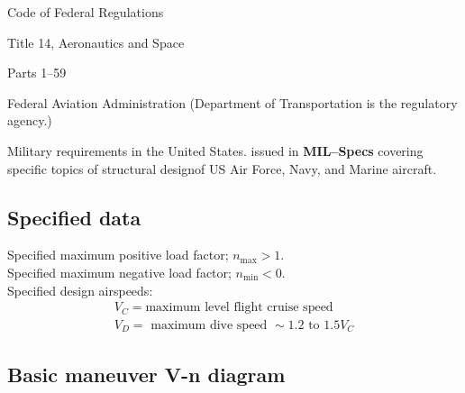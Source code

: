 \documentclass{AeroStructure-ERJohnson}
\begin{document}
\begin{unlist}
  \item[] Code of Federal Regulations
  \item[] \qquad Title 14, Aeronautics and Space
  \item[] \qquad Parts 1--59
  \item[] Federal Aviation Administration (Department of Transportation is the regulatory agency.)
  \item[] Military requirements in the United States. issued in \textbf{MIL--Specs} covering specific topics of structural design\break \hspace*{-15pt}of US Air Force, Navy, and Marine aircraft.
\end{unlist}

\subsection{Specified data}\label{sec2.4.3}

Specified maximum positive load factor; $n_{\max }>1$.\\
Specified maximum negative load factor; $n_{\min }<0$.\\
Specified design airspeeds:
\begin{gather*}
V_{C}=\text{maximum level flight cruise speed }\\
V_{D}=\text { maximum dive speed } \sim 1.2 \text { to } 1.5 V_{C}
\end{gather*}

\subsection{Basic maneuver V-n diagram}\label{sec2.4.4}
\end{document}

